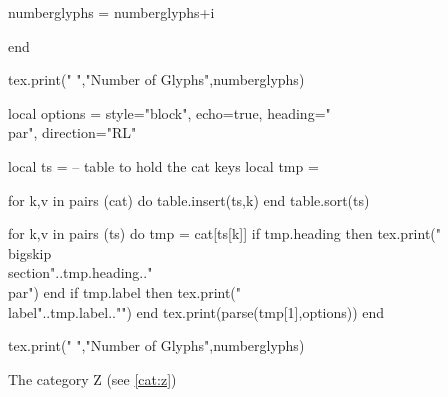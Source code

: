 \documentclass{article}
\begin{document}
\begin{luacode*}
numberglyphs = numberglyphs+i

end

tex.print(" ","Number of Glyphs",numberglyphs)




local options = {style="block",
                 echo=true,
                 heading="\\par",
                 direction="RL"}

local ts = {} -- table to hold the cat keys
local tmp = {}

for k,v in pairs (cat) do
   table.insert(ts,k)
end
table.sort(ts)

for k,v in pairs (ts) do
  tmp = cat[ts[k]]
  if tmp.heading then tex.print("{\\bigskip\\section{"..tmp.heading.."}}\\par") end
  if tmp.label then tex.print("\\label{"..tmp.label.."}") end
  tex.print(parse(tmp[1],options))
end


tex.print(" ","Number of Glyphs",numberglyphs)
\end{luacode*}

The category Z (see \ref{cat:z})
\end{document}
